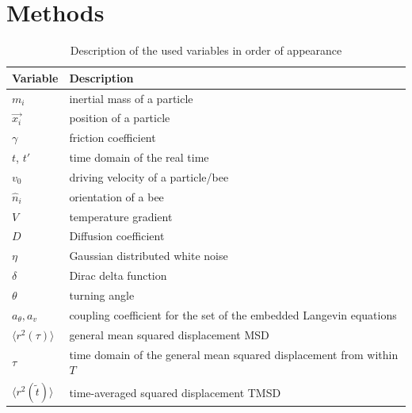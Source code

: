 \chapter{Methods}
\label{cha:Methods}


\begin{table}[H]
\caption{Description of the used variables in order of appearance}
    \centering
    \begin{tabular}{p{1.4cm}|p{12.4cm}}
         \textbf{Variable} & \textbf{Description} \\
         \hline
         \hline
         $m_{i}$ & inertial mass of a particle  \\
         \hline
         $\vec{x_{i}}$ & position of a particle   \\
         \hline
         $\gamma$ & friction coefficient  \\
         \hline
         $t$, $t'$ & time domain of the real time \\
         \hline
         $v_{0}$ & driving velocity of a particle/bee\\
         \hline
         $\hat{n}_{i}$ & orientation of a bee \\
         \hline
         $V$ & temperature gradient \\
         \hline
         $D$ & Diffusion coefficient \\
         \hline
         $\eta$ & Gaussian distributed white noise \\
         \hline
         $\delta$ & Dirac delta function \\
         \hline
         $\theta$ & turning angle \\
         \hline
         $a_{\theta}, a_{v}$ & coupling coefficient for the set of the embedded Langevin equations \\
         \hline
         $\langle r^{2}(\tau) \rangle$ & general mean squared displacement MSD\\
         \hline
         $\tau$ & time domain of the general mean squared displacement from within $T$\\
         \hline
         $\langle r^{2}(\tilde{t}) \rangle$ & time-averaged squared displacement TMSD\\

\end{tabular}
\end{table}
